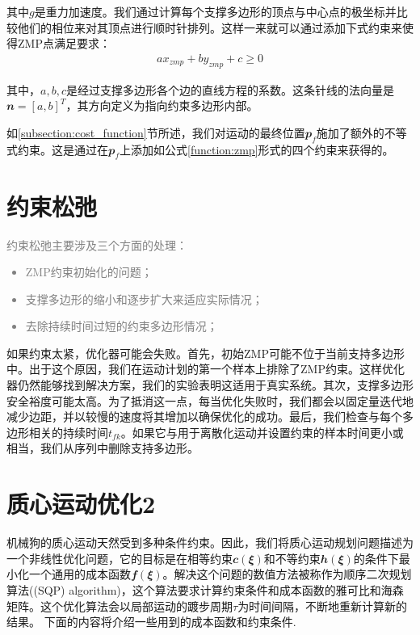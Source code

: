 其中$g$是重力加速度。我们通过计算每个支撑多边形的顶点与中心点的极坐标并比较他们的相位来对其顶点进行顺时针排列。这样一来就可以通过添加下式约束来使得ZMP点满足要求：
\begin{align}
    ax_{zmp}+by_{zmp}+c\geq 0
\end{align}

其中，$a,b,c$是经过支撑多边形各个边的直线方程的系数。这条针线的法向量是$\mathbfit{n}=[a,b]^T$，其方向定义为指向约束多边形内部。

如\ref{subsection:cost_function}节所述，我们对运动的最终位置$\mathbfit{p}_f$施加了额外的不等式约束。这是通过在$\mathbfit{p}_f$上添加如公式\eqref{function:zmp}形式的四个约束来获得的。


\section{约束松弛}
\textcolor{gray}{\small
约束松弛主要涉及三个方面的处理：
\begin{itemize}
    \item ZMP约束初始化的问题；
    \item 支撑多边形的缩小和逐步扩大来适应实际情况；
    \item 去除持续时间过短的约束多边形情况；
\end{itemize}
}

如果约束太紧，优化器可能会失败。首先，初始ZMP可能不位于当前支持多边形中。出于这个原因，我们在运动计划的第一个样本上排除了ZMP约束。这样优化器仍然能够找到解决方案，我们的实验表明这适用于真实系统。其次，支撑多边形安全裕度可能太高。为了抵消这一点，每当优化失败时，我们都会以固定量迭代地减少边距，并以较慢的速度将其增加以确保优化的成功。最后，我们检查与每个多边形相关的持续时间$t_{fk}$。如果它与用于离散化运动并设置约束的样本时间更小或相当，我们从序列中删除支持多边形。

\section{质心运动优化2}

机械狗的质心运动天然受到多种条件约束。因此，我们将质心运动规划问题描述为一个非线性优化问题，它的目标是在相等约束${\mathbfit c}({\mathbfit \xi})$和不等约束${\mathbfit h}({\mathbfit \xi})$的条件下最小化一个通用的成本函数${\mathbfit f}({\mathbfit \xi})$。解决这个问题的数值方法被称作为顺序二次规划算法((SQP) algorithm)，这个算法要求计算约束条件和成本函数的雅可比和海森矩阵。这个优化算法会以局部运动的踱步周期$\tau$为时间间隔，不断地重新计算新的结果。
下面的内容将介绍一些用到的成本函数和约束条件.


